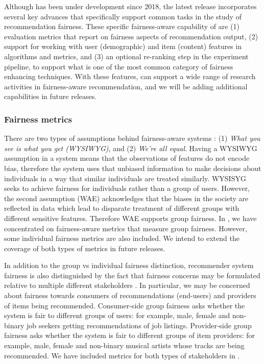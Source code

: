 Although \libauto{} has been under development since 2018, the latest release incorporates several key advances that specifically support common tasks in the study of recommendation fairness. These specific fairness-aware capability of \libauto{} are (1) evaluation metrics that report on fairness aspects of recommendation output, (2) support for working with user (demographic) and item (content) features in algorithms and metrics, and (3) an optional re-ranking step in the experiment pipeline, to support what is one of the most common category of fairness enhancing techniques.
With these features, \libauto{} can support a wide range of research activities in fairness-aware recommendation, and we will be adding additional capabilities in future releases.


\subsubsection{Fairness metrics}
\label{subsubsec:libauto_fairmetrics}

There are two types of assumptions behind fairness-aware systems \cite{friedler-impossibility-2021}: (1) \textit{What you see is what you get (WYSIWYG)}, and (2) \textit{We're all equal}. Having a WYSIWYG assumption in a system means that the observations of features do not encode bias, therefore the system uses that unbiased information to make decisions about individuals in a way that similar individuals are treated similarly. WYSISYG seeks to achieve fairness for individuals rather than a group of users. However, the second assumption (WAE) acknowledges that the biases in the society are reflected in data which lead to disparate treatment of different groups with different sensitive features. Therefore WAE supports group fairness. In \libauto{}, we have concentrated on fairness-aware metrics that measure group fairness. However, some individual fairness metrics are also included. We intend to extend the coverage of both types of metrics in future releases.

In addition to the group vs individual fairness distinction, recommender system fairness is also distinguished by the fact that fairness concerns may be formulated relative to multiple different stakeholders \cite{burke2017multisided,abdollahpouri2020multistakeholder}. In particular, we may be concerned about fairness towards consumers of recommendations (end-users) and providers of items being recommended. Consumer-side group fairness asks whether the system is fair to different groups of users: for example, male, female and non-binary job seekers getting recommendations of job listings. Provider-side group fairness asks whether the system is fair to different groups of item providers: for example, male, female and non-binary musical artists whose tracks are being recommended. We have included metrics for both types of stakeholders in \libauto{}.

